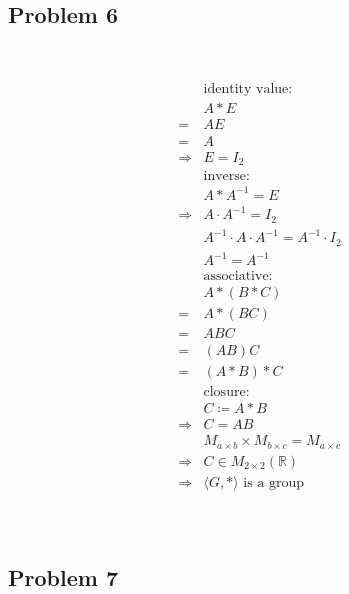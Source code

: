 \documentclass{article}
\begin{document}
~

\subsection*{Problem 6}

~

\begin{equation*}
    \begin{split}
        &\text{identity value}:\\
        &A*E\\
        =&AE\\
        =&A\\
        \Rightarrow&E=I_2\\
        &\text{inverse}:\\
        &A*A^{-1}=E\\
        \Rightarrow&A\cdot A^{-1}=I_2\\
        &A^{-1}\cdot A \cdot A^{-1}=A^{-1}\cdot I_2\\
        &A^{-1}=A^{-1}\\
        &\text{associative}:\\
        &A*(B*C)\\
        =&A*(BC)\\
        =&ABC\\
        =&(AB)C\\
        =&(A*B)*C\\
        &\text{closure}:\\
        &C\coloneqq A*B\\
        \Rightarrow&C=AB\\
        &M_{a\times b}\times M_{b\times c}=M_{a\times c}\\
        \Rightarrow&C\in M_{2\times 2}(\mathbb{R} )\\
        \Rightarrow&\langle G,*\rangle\text{ is a group}\\
    \end{split}
\end{equation*}

~

\subsection*{Problem 7}

~
\end{document}
